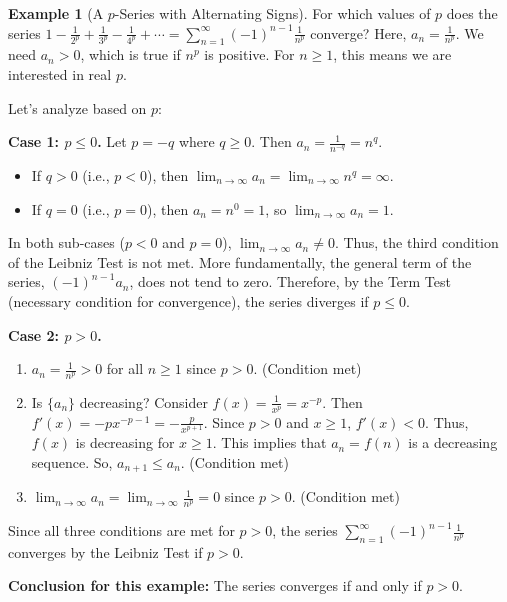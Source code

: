 \documentclass[11pt, a4paper]{article}
\theoremstyle{plain}
\theoremstyle{definition}
\newtheorem{example}[theorem]{Example} %
\theoremstyle{remark}
\begin{document}
\begin{example}[A $p$-Series with Alternating Signs]
For which values of $p$ does the series $1 - \frac{1}{2^p} + \frac{1}{3^p} - \frac{1}{4^p} + \dotsb = \sum_{n=1}^{\infty} (-1)^{n-1} \frac{1}{n^p}$ converge?
Here, $a_n = \frac{1}{n^p}$. We need $a_n > 0$, which is true if $n^p$ is positive. For $n \ge 1$, this means we are interested in real $p$.

Let's analyze based on $p$:

\textbf{Case 1: $p \le 0$.}
Let $p = -q$ where $q \ge 0$. Then $a_n = \frac{1}{n^{-q}} = n^q$.
    \begin{itemize}
        \item If $q > 0$ (i.e., $p < 0$), then $\lim_{n \to \infty} a_n = \lim_{n \to \infty} n^q = \infty$.
        \item If $q = 0$ (i.e., $p = 0$), then $a_n = n^0 = 1$, so $\lim_{n \to \infty} a_n = 1$.
    \end{itemize}
    In both sub-cases ($p<0$ and $p=0$), $\lim_{n \to \infty} a_n \neq 0$.
    Thus, the third condition of the Leibniz Test is not met. More fundamentally, the general term of the series, $(-1)^{n-1} a_n$, does not tend to zero. Therefore, by the Term Test (necessary condition for convergence), the series diverges if $p \le 0$.

\textbf{Case 2: $p > 0$.}
    \begin{enumerate}[label=(\roman*)]
        \item $a_n = \frac{1}{n^p} > 0$ for all $n \ge 1$ since $p > 0$. (Condition met)
        \item Is $\{a_n\}$ decreasing? Consider $f(x) = \frac{1}{x^p} = x^{-p}$. Then $f'(x) = -p x^{-p-1} = -\frac{p}{x^{p+1}}$.
        Since $p > 0$ and $x \ge 1$, $f'(x) < 0$. Thus, $f(x)$ is decreasing for $x \ge 1$.
        This implies that $a_n = f(n)$ is a decreasing sequence. So, $a_{n+1} \le a_n$. (Condition met)
        \item $\lim_{n \to \infty} a_n = \lim_{n \to \infty} \frac{1}{n^p} = 0$ since $p > 0$. (Condition met)
    \end{enumerate}
    Since all three conditions are met for $p > 0$, the series $\sum_{n=1}^{\infty} (-1)^{n-1} \frac{1}{n^p}$ converges by the Leibniz Test if $p > 0$.

\textbf{Conclusion for this example:} The series converges if and only if $p > 0$.
\end{example}
\end{document}
